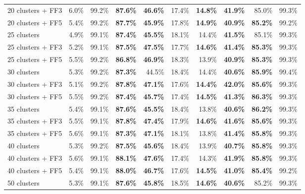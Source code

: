 \begin{table}[!h]
\begin{center}
\begin{tabular}{lrrrrrrrrr}
20 clusters + FF3	& 6.0\% & 99.2\% & \textbf{87.6\%} & \textbf{46.6\%} & 17.4\% & \textbf{14.8\%} & \textbf{41.9\%} & 85.0\% & 99.3\% \\
20 clusters + FF5	& 5.4\% & 99.2\% & \textbf{87.7\%} & \textbf{45.9\%} & 17.8\% & \textbf{14.9\%} & \textbf{40.9\%} & \textbf{85.2\%} & 99.2\% \\
25 clusters	& 4.9\% & 99.1\% & \textbf{87.4\%} & \textbf{45.5\%} & 18.1\% & 14.4\% & \textbf{41.5\%} & 85.1\% & 99.3\% \\
25 clusters + FF3	& 5.2\% & 99.1\% & \textbf{87.5\%} & \textbf{47.5\%} & 17.7\% & \textbf{14.6\%} & \textbf{41.4\%} & \textbf{85.3\%} & 99.3\% \\
25 clusters + FF5	& 5.5\% & 99.2\% & \textbf{86.8\%} & \textbf{46.9\%} & 18.3\% & 13.9\% & \textbf{40.9\%} & \textbf{85.3\%} & 99.3\% \\
30 clusters	& 5.3\% & 99.2\% & \textbf{87.3\%} & 44.5\% & 18.4\% & 14.4\% & \textbf{40.6\%} & \textbf{85.9\%} & 99.4\% \\
30 clusters + FF3	& 5.1\% & 99.2\% & \textbf{87.8\%} & \textbf{47.1\%} & 17.6\% & \textbf{14.4\%} & \textbf{42.0\%} & \textbf{85.6\%} & 99.3\% \\
30 clusters + FF5	& 5.5\% & 99.2\% & \textbf{87.4\%} & \textbf{45.7\%} & 17.4\% & \textbf{14.5\%} & \textbf{41.3\%} & \textbf{86.3\%} & 99.3\% \\
35 clusters	& 5.4\% & 99.1\% & \textbf{87.6\%} & \textbf{45.5\%} & 18.4\% & 13.8\% & \textbf{40.6\%} & \textbf{86.2\%} & 99.3\% \\
35 clusters + FF3	& 5.5\% & 99.1\% & \textbf{87.8\%} & \textbf{47.4\%} & 17.9\% & \textbf{14.6\%} & \textbf{41.6\%} & \textbf{85.6\%} & 99.3\% \\
35 clusters + FF5	& 5.6\% & 99.1\% & \textbf{87.3\%} & \textbf{47.1\%} & 18.1\% & 13.8\% & \textbf{41.4\%} & \textbf{85.8\%} & 99.3\% \\
40 clusters	& 5.3\% & 99.2\% & \textbf{87.5\%} & \textbf{45.6\%} & 18.4\% & 13.9\% & \textbf{40.7\%} & \textbf{85.8\%} & 99.3\% \\
40 clusters + FF3	& 5.6\% & 99.1\% & \textbf{88.1\%} & \textbf{47.6\%} & 17.4\% & 14.3\% & \textbf{41.9\%} & \textbf{85.8\%} & 99.3\% \\
40 clusters + FF5	& 5.4\% & 99.1\% & \textbf{88.0\%} & \textbf{46.7\%} & 17.6\% & \textbf{14.5\%} & \textbf{41.0\%} & \textbf{85.4\%} & 99.2\% \\
50 clusters	& 5.3\% & 99.1\% & \textbf{87.6\%} & \textbf{45.8\%} & 18.5\% & \textbf{14.6\%} & \textbf{40.6\%} & 85.2\% & 99.3\% \\

\end{tabular}
\end{center}
\end{table}
